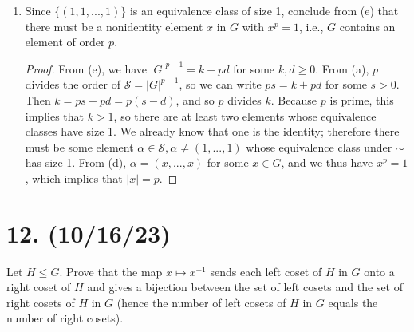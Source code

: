 \documentclass{article}
\begin{document}
\begin{enumerate}[label=(\alph*), itemsep=0em, start=2]
\begin{proof}
            The equivalence classes of the elements of $\mathcal{S}$ partition $\mathcal{S}$. Suppose there are $k$ equivalence classes of order 1, and $d$ equivalence classes of order $p$. From (a), the order of $\mathcal{S}$ is $|G|^{p - 1}$. Then we have $|G|^{p - 1} = k + pd$.
          \end{proof}
    \item Since $\{ (1, 1, ..., 1) \}$ is an equivalence class of size 1, conclude from (e) that there must be a nonidentity element $x$ in $G$ with $x^p = 1$, i.e., $G$ contains an element of order $p$.
          \begin{proof}
            From (e), we have $|G|^{p - 1} = k + pd$ for some $k, d \geq 0$. From (a), $p$ divides the order of $\mathcal{S} = |G|^{p - 1}$, so we can write $ps = k + pd$ for some $s > 0$. Then $k = ps - pd = p(s - d)$, and so $p$ divides $k$. Because $p$ is prime, this implies that $k > 1$, so there are at least two elements whose equivalence classes have size 1. We already know that one is the identity; therefore there must be some element $\alpha \in \mathcal{S}, \alpha \neq (1, ..., 1)$ whose equivalence class under $\sim$ has size 1. From (d), $\alpha = (x, ..., x)$ for some $x \in G$, and we thus have $x^p = 1$, which implies that $|x| = p$.
          \end{proof}
\end{enumerate}

\section*{12. (10/16/23)}

Let $H \leq G$. Prove that the map $x \mapsto x^{-1}$ sends each left coset of $H$ in $G$ onto a right coset of $H$ and gives a bijection between the set of left cosets and the set of right cosets of $H$ in $G$ (hence the number of left cosets of $H$ in $G$ equals the number of right cosets).
\end{document}
